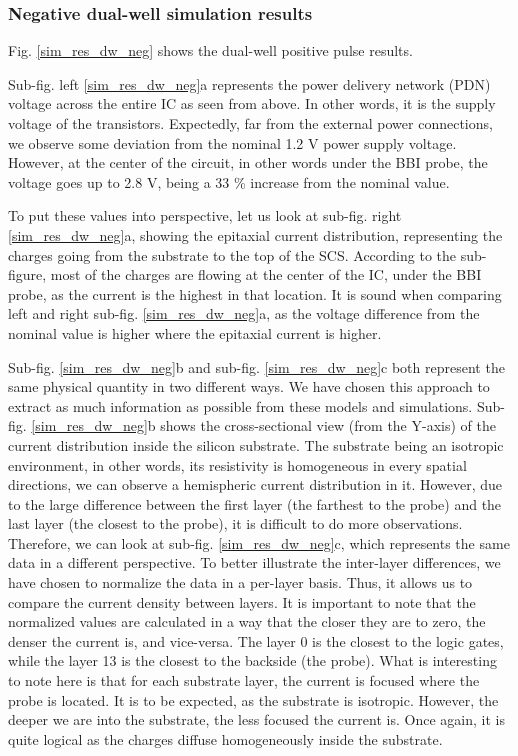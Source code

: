 	\subsubsection{Negative dual-well simulation results}
		Fig. \ref{sim_res_dw_neg} shows the dual-well positive pulse results.

		Sub-fig. left \ref{sim_res_dw_neg}a represents the power delivery network (PDN) voltage across the entire IC as seen from above.
		In other words, it is the supply voltage of the transistors.
		Expectedly, far from the external power connections, we observe some deviation from the nominal 1.2 V power supply voltage.
		However, at the center of the circuit, in other words under the BBI probe, the voltage goes up to 2.8 V, being a 33 \% increase from the nominal value.

		To put these values into perspective, let us look at sub-fig. right \ref{sim_res_dw_neg}a, showing the epitaxial current distribution, representing the charges going from the substrate to the top of the SCS.
		According to the sub-figure, most of the charges are flowing at the center of the IC, under the BBI probe, as the current is the highest in that location.
		It is sound when comparing left and right sub-fig. \ref{sim_res_dw_neg}a, as the voltage difference from the nominal value is higher where the epitaxial current is higher.

		Sub-fig. \ref{sim_res_dw_neg}b and sub-fig. \ref{sim_res_dw_neg}c both represent the same physical quantity in two different ways.
		We have chosen this approach to extract as much information as possible from these models and simulations.
		Sub-fig. \ref{sim_res_dw_neg}b shows the cross-sectional view (from the Y-axis) of the current distribution inside the silicon substrate.
		The substrate being an isotropic environment, in other words, its resistivity is homogeneous in every spatial directions, we can observe a hemispheric current distribution in it.
		However, due to the large difference between the first layer (the farthest to the probe) and the last layer (the closest to the probe), it is difficult to do more observations.
		Therefore, we can look at sub-fig. \ref{sim_res_dw_neg}c, which represents the same data in a different perspective.
		To better illustrate the inter-layer differences, we have chosen to normalize the data in a per-layer basis.
		Thus, it allows us to compare the current density between layers.
		It is important to note that the normalized values are calculated in a way that the closer they are to zero, the denser the current is, and vice-versa.
		The layer 0 is the closest to the logic gates, while the layer 13 is the closest to the backside (the probe).
		What is interesting to note here is that for each substrate layer, the current is focused where the probe is located.
		It is to be expected, as the substrate is isotropic.
		However, the deeper we are into the substrate, the less focused the current is.
		Once again, it is quite logical as the charges diffuse homogeneously inside the substrate.

